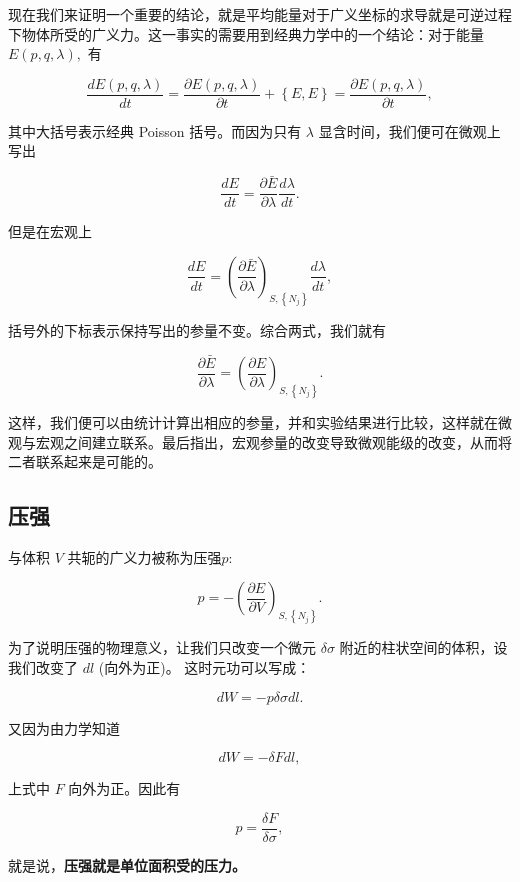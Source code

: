 现在我们来证明一个重要的结论，就是平均能量对于广义坐标的求导就是可逆过程下物体所受的广义力。这一事实的需要用到经典力学中的一个结论：对于能量 $E(p,q,\lambda),$ 有 \begin{linenomath}\begin{equation}
\frac{dE(p,q,\lambda)}{dt} = \frac{\partial E(p,q,\lambda)}{\partial t} +\left\{ E,E \right\} = \frac{\partial E(p,q,\lambda)}{\partial t},
\end{equation}\end{linenomath}
其中大括号表示经典 Poisson 括号。而因为只有 $\lambda$ 显含时间，我们便可在微观上写出
\begin{linenomath}\begin{equation}
\frac{dE}{dt} = \frac{\partial \bar E}{\partial \lambda} \frac{d \lambda}{dt}.
\end{equation}\end{linenomath}
但是在宏观上
\begin{linenomath}\begin{equation}
\frac{dE}{dt} = \left( \frac{\partial \bar E}{\partial \lambda} \right)_{S,\left\{ N_j \right\}} \frac{d \lambda}{dt},
\end{equation}\end{linenomath}
括号外的下标表示保持写出的参量不变。综合两式，我们就有
\begin{linenomath}\begin{equation}\frac{\partial \bar E}{\partial \lambda} = \left( \frac{\partial  E}{\partial \lambda} \right)_{S,\left\{ N_j \right\}}.\label{macro_micro1}\end{equation}\end{linenomath}
这样，我们便可以由统计计算出相应的参量，并和实验结果进行比较，这样就在微观与宏观之间建立联系。最后指出，宏观参量的改变导致微观能级的改变，从而将二者联系起来是可能的。
\subsection{压强}
与体积 $V$ 共轭的广义力被称为压强$p:$ \begin{linenomath}\begin{equation}p = -\left( \frac{\partial E}{\partial V} \right)_{S,\left\{ N_j \right\}}. \end{equation}\end{linenomath} 为了说明压强的物理意义，让我们只改变一个微元 $\delta \sigma$ 附近的柱状空间的体积，设我们改变了 $dl$ (向外为正)。  这时元功可以写成：
\begin{linenomath}\begin{equation}dW = -p\delta \sigma dl.\end{equation}\end{linenomath} 又因为由力学知道 \begin{linenomath}\begin{equation}dW = -\delta F dl,\end{equation}\end{linenomath} 上式中 $F$ 向外为正。因此有 \begin{linenomath}\begin{equation}p = \frac{\delta F}{\delta \sigma},\end{equation}\end{linenomath} 就是说，\textbf{压强就是单位面积受的压力。}

